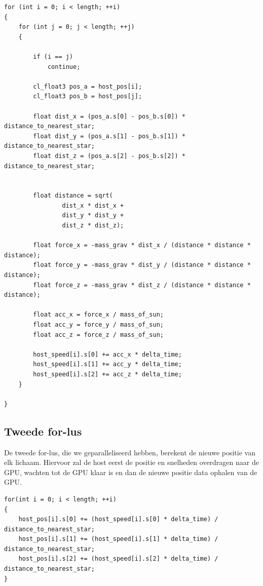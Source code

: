 \documentclass{article}
\begin{document}
\begin{lstlisting}[caption={De eerste for-lus}, label={code:for1}, breaklines=true, basicstyle=\footnotesize]
for (int i = 0; i < length; ++i)
{
    for (int j = 0; j < length; ++j)
    {

        if (i == j)
            continue;

        cl_float3 pos_a = host_pos[i];
        cl_float3 pos_b = host_pos[j];

        float dist_x = (pos_a.s[0] - pos_b.s[0]) * distance_to_nearest_star;
        float dist_y = (pos_a.s[1] - pos_b.s[1]) * distance_to_nearest_star;
        float dist_z = (pos_a.s[2] - pos_b.s[2]) * distance_to_nearest_star;


        float distance = sqrt(
                dist_x * dist_x +
                dist_y * dist_y +
                dist_z * dist_z);

        float force_x = -mass_grav * dist_x / (distance * distance * distance);
        float force_y = -mass_grav * dist_y / (distance * distance * distance);
        float force_z = -mass_grav * dist_z / (distance * distance * distance);

        float acc_x = force_x / mass_of_sun;
        float acc_y = force_y / mass_of_sun;
        float acc_z = force_z / mass_of_sun;

        host_speed[i].s[0] += acc_x * delta_time;
        host_speed[i].s[1] += acc_y * delta_time;
        host_speed[i].s[2] += acc_z * delta_time;
    }

}
\end{lstlisting}

\subsection{Tweede for-lus}
\label{hfd:niet-atomisch-for2}
De tweede for-lus, die we geparalleliseerd hebben, berekent de nieuwe positie
van elk lichaam. Hiervoor zal de host eerst de positie en snelheden overdragen
naar de GPU, wachten tot de GPU klaar is en dan de nieuwe positie data ophalen
van de GPU.

\begin{lstlisting}[caption={De tweede for-lus}, label={code:for2}, breaklines=true, basicstyle=\footnotesize]
for(int i = 0; i < length; ++i)
{
    host_pos[i].s[0] += (host_speed[i].s[0] * delta_time) / distance_to_nearest_star;
    host_pos[i].s[1] += (host_speed[i].s[1] * delta_time) / distance_to_nearest_star;
    host_pos[i].s[2] += (host_speed[i].s[2] * delta_time) / distance_to_nearest_star;
}
\end{lstlisting}
\end{document}
